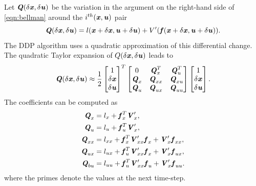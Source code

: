Let $\bQ(\dx,\du)$ be the variation in the argument on the right-hand side of \cref{eqn:bellman} around the $i^{th} (\bx,\bu)$ pair
\begin{equation}\label{eqn:Q}
\bQ(\dx,\du)=l(\bx+\dx,\bu+\du)+V'(\bfun(\bx+\dx,\bu+\du)).
\end{equation}
The \gls{DDP} algorithm uses a quadratic approximation of this differential change. The quadratic Taylor expansion of $Q(\dx,\du)$ leads to
\begin{equation}\label{eqn:QApprox}
\bQ(\dx,\du) \approx \dfrac{1}{2} 
\begin{bmatrix} 1 \\ \dx \\ \du \end{bmatrix}^T 
\begin{bmatrix} 0 & \bQ_{x}^T & \bQ_{u}^T \\
\bQ_{x} & \bQ_{xx} & \bQ_{xu} \\
\bQ_{u} & \bQ_{ux} & \bQ_{uu} \end{bmatrix}
\begin{bmatrix} 1 \\ \dx \\ \du \end{bmatrix}.
\end{equation}
The coefficients can be computed as  
\begin{subequations}\label{eqn:QApproxCoeff}
\begin{align}
\bQ_{x} &= l_{x}+\bfun_{x}^T \bV_{x}^\prime, \\
\bQ_{u} &= l_{u}+\bfun_{u}^T \bV_{x}^\prime, \\
\bQ_{xx} &= l_{xx}+\bfun_{x}^T \bV_{xx}^\prime\bfun_{x}+\bV_{x}^\prime\bfun_{xx}  \label{subeqn:Qxx},\\
\bQ_{ux} &= l_{ux}+\bfun_{u}^T \bV_{xx}^\prime\bfun_{x}+\bV_{x}^\prime\bfun_{ux} \label{subeqn:Qux},\\
\bQ_{bu} &= l_{uu}+\bfun_{u}^T \bV_{xx}^\prime\bfun_{u}+\bV_{x}^\prime\bfun_{uu} \label{subeqn:Quu}.
\end{align}
\end{subequations}
where the primes denote the values at the next time-step.  

